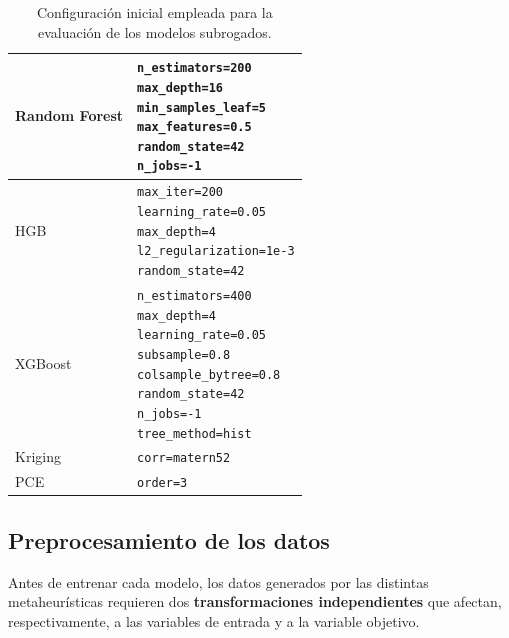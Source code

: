 \begin{table}[htbp]
\begin{tabular}{l p{7cm}}
        \midrule
        Random Forest   & \makecell[l]{\texttt{n\_estimators=200}                                                 \\ \texttt{max\_depth=16} \\ \texttt{min\_samples\_leaf=5} \\ \texttt{max\_features=0.5} \\ \texttt{random\_state=42} \\ \texttt{n\_jobs=-1}} \\
        \midrule
        HGB             & \makecell[l]{\texttt{max\_iter=200}                                                     \\ \texttt{learning\_rate=0.05} \\ \texttt{max\_depth=4} \\ \texttt{l2\_regularization=1e-3} \\ \texttt{random\_state=42}} \\
        \midrule
        XGBoost         & \makecell[l]{\texttt{n\_estimators=400}                                                 \\ \texttt{max\_depth=4} \\ \texttt{learning\_rate=0.05} \\ \texttt{subsample=0.8} \\ \texttt{colsample\_bytree=0.8} \\ \texttt{random\_state=42} \\ \texttt{n\_jobs=-1} \\ \texttt{tree\_method=hist}} \\
        \midrule
        Kriging         & \texttt{corr=matern52}                                                                  \\
        \midrule
        PCE             & \texttt{order=3}                                                                        \\
        \bottomrule
    \end{tabular}
    \caption{Configuración inicial empleada para la evaluación de los modelos subrogados.}
    \label{tab:surrogate_models_config}
\end{table}

\subsection{Preprocesamiento de los datos}
\label{subsec:preprocesamiento}

Antes de entrenar cada modelo, los datos generados por las distintas metaheurísticas requieren dos \textbf{transformaciones independientes} que afectan, respectivamente, a las variables de entrada y a la variable objetivo.

